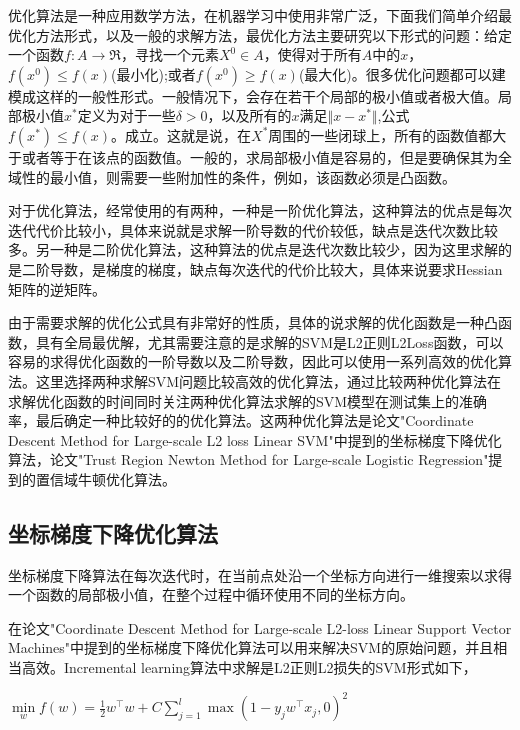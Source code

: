 \documentclass[master]{njuthesis}
\begin{document}
优化算法是一种应用数学方法，在机器学习中使用非常广泛，下面我们简单介绍最优化方法形式，以及一般的求解方法，最优化方法主要研究以下形式的问题：给定一个函数$f:A\rightarrow\Re$，寻找一个元素$X^0 \in A$，使得对于所有$A$中的$x$，$f\left(x^0\right) \le f\left(x\right)$(最小化);或者$f\left(x^0\right) \ge f\left(x\right)$(最大化)。很多优化问题都可以建模成这样的一般性形式。一般情况下，会存在若干个局部的极小值或者极大值。局部极小值$x^\ast$定义为对于一些$\delta>0$，以及所有的$x$满足$\Vert x-x^\ast\Vert$,公式$f\left(x^\ast \right) \le f\left(x\right)$。成立。这就是说，在$X^\ast$周围的一些闭球上，所有的函数值都大于或者等于在该点的函数值。一般的，求局部极小值是容易的，但是要确保其为全域性的最小值，则需要一些附加性的条件，例如，该函数必须是凸函数。
    
    对于优化算法，经常使用的有两种，一种是一阶优化算法，这种算法的优点是每次迭代代价比较小，具体来说就是求解一阶导数的代价较低，缺点是迭代次数比较多。另一种是二阶优化算法，这种算法的优点是迭代次数比较少，因为这里求解的是二阶导数，是梯度的梯度，缺点每次迭代的代价比较大，具体来说要求Hessian矩阵的逆矩阵。
    
    由于需要求解的优化公式具有非常好的性质，具体的说求解的优化函数是一种凸函数，具有全局最优解，尤其需要注意的是求解的SVM是L2正则L2Loss函数，可以容易的求得优化函数的一阶导数以及二阶导数，因此可以使用一系列高效的优化算法。这里选择两种求解SVM问题比较高效的优化算法，通过比较两种优化算法在求解优化函数的时间同时关注两种优化算法求解的SVM模型在测试集上的准确率，最后确定一种比较好的的优化算法。这两种优化算法是论文"Coordinate Descent Method for Large-scale L2 loss Linear SVM"中提到的坐标梯度下降优化算法，论文"Trust Region Newton Method for Large-scale Logistic Regression"提到的置信域牛顿优化算法。

\subsection{坐标梯度下降优化算法}
    
    坐标梯度下降算法在每次迭代时，在当前点处沿一个坐标方向进行一维搜索以求得一个函数的局部极小值，在整个过程中循环使用不同的坐标方向。

    在论文"Coordinate Descent Method for Large-scale L2-loss Linear Support Vector Machines"中提到的坐标梯度下降优化算法可以用来解决SVM的原始问题，并且相当高效。Incremental learning算法中求解是L2正则L2损失的SVM形式如下，

    $\min\limits_{w} f\left(w\right) = \frac{1}{2}w^\intercal w+ C\sum_{j=1}^l \max\left(1-y_jw^\intercal x_j,0\right)^2$
    
\end{document}
